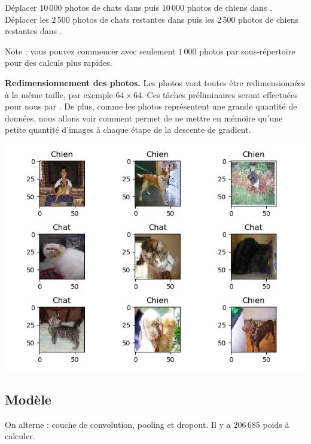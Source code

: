 \documentclass[11pt,class=report,crop=false]{standalone}
\begin{document}
Déplacer $10\,000$ photos de chats dans  
 puis $10\,000$ photos de chiens dans .
Déplacer les $2\,500$ photos de chats restantes  dans 
puis les $2\,500$ photos de chiens restantes dans .

Note : vous pouvez commencer avec seulement $1\,000$ photos par sous-répertoire pour des calculs plus rapides.

\textbf{Redimensionnement des photos.}
Les photos vont toutes être redimensionnées à la même taille, par exemple $64 \times 64$.
Ces tâches préliminaires seront effectuées pour nous par \keras.
De plus, comme les photos représentent une grande quantité de données, nous allons voir comment \keras{} permet de ne mettre en mémoire qu'une petite quantité d'images à chaque étape de la descente de gradient.


\begin{center}
\includegraphics[scale=\myscale,scale=0.6]{figures/tfconv-chienchat-train}
\end{center}


\subsection{Modèle}

On alterne : couche de convolution, pooling et dropout.
Il y a $206\,685$ poids à calculer.



\end{document}
